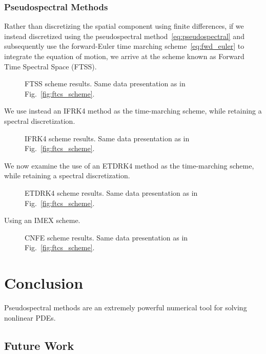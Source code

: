 \documentclass[10pt]{article}
\begin{document}
\subsubsection{Pseudospectral Methods}

Rather than discretizing the spatial component using finite differences, if we instead discretized using the pseudospectral method~\eqref{eq:pseudospectral} and subsequently use the forward-Euler time marching scheme~\eqref{eq:fwd_euler} to integrate the equation of motion, we arrive at the scheme known as Forward Time Spectral Space (FTSS).

\begin{figure}[!h]
    \centering
    \caption{FTSS scheme results. Same data presentation as in Fig.~\ref{fig:ftcs_scheme}.}
    \label{fig:ftss_scheme}
\end{figure}

We use instead an IFRK4 method as the time-marching scheme, while retaining a spectral discretization.

\begin{figure}[!h]
    \centering
    \caption{IFRK4 scheme results. Same data presentation as in Fig.~\ref{fig:ftcs_scheme}.}
    \label{fig:ifrk4_scheme}
\end{figure}

We now examine the use of an ETDRK4 method as the time-marching scheme, while retaining a spectral discretization.

\begin{figure}[!h]
    \centering
    \caption{ETDRK4 scheme results. Same data presentation as in Fig.~\ref{fig:ftcs_scheme}.}
    \label{fig:etdrk4_scheme}
\end{figure}

Using an IMEX scheme. 

\begin{figure}[!h]
    \centering
    \caption{CNFE scheme results. Same data presentation as in Fig.~\ref{fig:ftcs_scheme}.}
    \label{fig:cnfe_scheme}
\end{figure}

\section{Conclusion}

Pseudospectral methods are an extremely powerful numerical tool for solving nonlinear PDEs. 

\subsection{Future Work}
    
    
    
\end{document}
